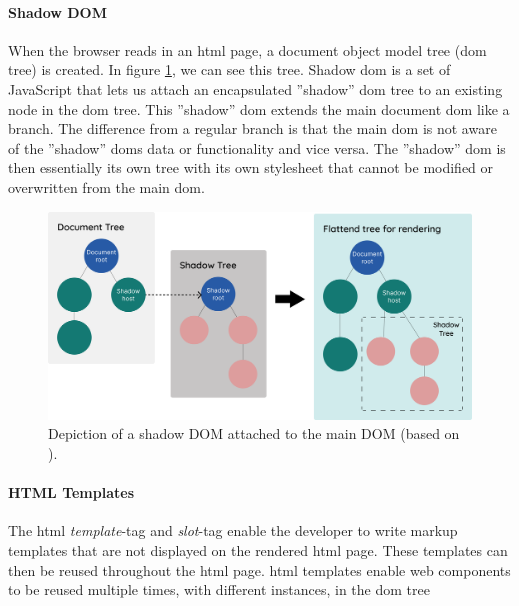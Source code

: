 \paragraph{Shadow DOM}%
\label{ssub:Shadow DOM}
When the browser reads in an \acrshort{html} page, a document object model tree (\acrshort{dom} tree) is created.  In figure \ref{fig:shadow}, we can see this tree. Shadow \acrshort{dom} is a set of JavaScript  that lets us attach an encapsulated ''shadow'' \acrshort{dom} tree to an existing node in the \acrshort{dom} tree. This ''shadow'' \acrshort{dom} extends the main document \acrshort{dom} like a branch. The difference from a regular branch is that the main \acrshort{dom} is not aware of the ''shadow'' \acrshort{dom}s data or functionality and vice versa. The ''shadow'' \acrshort{dom} is then essentially its own tree with its own stylesheet that cannot be modified or overwritten from the main \acrshort{dom}.\\
\begin{figure}[H]
  \centering
  \includegraphics[width=0.9\linewidth]{images/ShadowDomIllustration.png}
  \caption{Depiction of a shadow DOM attached to the main DOM (based on \cite{UsingShadowDOM}).}%
  \label{fig:shadow}
\end{figure}




\paragraph{HTML Templates}%
\label{ssub:HMTL Templates}
The \acrshort{html} \textit{template}-tag and \textit{slot}-tag enable the developer to write markup templates that are not displayed on the rendered \acrshort{html} page. These templates can then be reused throughout the \acrshort{html} page. \acrshort{html} templates enable web components to be reused multiple times, with different instances, in the \acrshort{dom} tree


